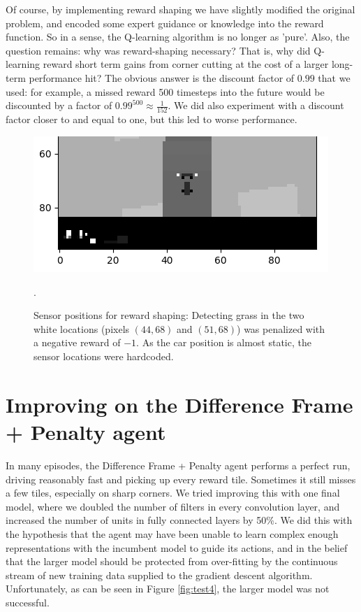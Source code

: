 \documentclass[a4paper, 11pt, conference]{ieeeconf}      %
\begin{document}
Of course, by implementing reward shaping we have slightly modified the original problem, and encoded some expert guidance or knowledge into the reward function. So in a sense, the Q-learning algorithm is no longer as 'pure'. Also, the question remains: why was reward-shaping necessary? That is, why did Q-learning reward short term gains from corner cutting at the cost of a larger long-term performance hit? The obvious answer is the discount factor of $0.99$ that we used: for example, a missed reward 500 timesteps into the future would be discounted by a factor of $0.99^{500} \approx \frac{1}{152}$. We did also experiment with a discount factor closer to and equal to one, but this led to worse performance.

\begin{figure}
  \includegraphics[width=\linewidth]{figs/reward_shaping_closeup.png}
  \caption{Sensor positions for reward shaping: Detecting grass in the two white locations (pixels $(44, 68)$ and $(51,68)$) was penalized with a negative reward of $-1$. As the car position is almost static, the sensor locations were hardcoded.}.
  \label{fig:reward_shaping}
\end{figure}

\section{Improving on the Difference Frame + Penalty agent}

In many episodes, the Difference Frame + Penalty agent performs a perfect run, driving reasonably fast and picking up every reward tile. Sometimes it still misses a few tiles, especially on sharp corners. We tried improving this with one final model, where we doubled the number of filters in every convolution layer, and increased the number of units in fully connected layers by 50\%. We did this with the hypothesis that the agent may have been unable to learn complex enough representations with the incumbent model to guide its actions, and in the belief that the larger model should be protected from over-fitting by the continuous stream of new training data supplied to the gradient descent algorithm. Unfortunately, as can be seen in Figure \ref{fig:test4}, the larger model was not successful.
\end{document}
